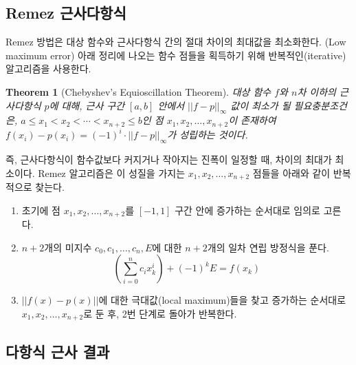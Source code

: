 \documentclass[a4paper, 11pt, chapterprefix=false]{report}
\newtheorem{theorem}{Theorem}
\begin{document}
\subsection{Remez 근사다항식}

Remez 방법은 대상 함수와 근사다항식 간의 절대 차이의 최대값을 최소화한다. (Low
maximum error) 아래 정리에 나오는 함수 점들을 획득하기 위해 반복적인(iterative)
알고리즘을 사용한다.

\begin{theorem}[Chebyshev's Equioscillation Theorem]
대상 함수 $f$와 $n$차 이하의 근사다항식 $p$에 대해, 근사 구간 $[a, b]$ 안에서
$||f-p||_\infty$ 값이 최소가 될 필요충분조건은, $a \leq x_1 < x_2 < \cdots <
x_{n+2} \leq b$인 점 $x_1, x_2, \dots, x_{n+2}$이 존재하여 $f(x_i) - p(x_i) =
(-1)^i \cdot ||f-p||_\infty$가 성립하는 것이다.
\end{theorem}

즉, 근사다항식이 함수값보다 커지거나 작아지는 진폭이 일정할 때, 차이의 최대가
최소이다. Remez 알고리즘은 이 성질을 가지는 $x_1, x_2, \dots, x_{n+2}$ 점들을
아래와 같이 반복적으로 찾는다.
\begin{enumerate}
  \item 초기에 점 $x_1, x_2, \dots, x_{n+2}$를 $[-1, 1]$ 구간 안에 증가하는 순서대로 임의로 고른다.
  \item $n+2$개의 미지수 $c_0, c_1, \dots, c_n, E$에 대한 $n+2$개의 일차 연립 방정식을 푼다.
        $$ \left( \sum_{i=0}^n c_i x_k^i \right) + (-1)^k E = f(x_k) $$
  \item $||f(x) - p(x)||$에 대한 극대값(local maximum)들을 찾고 증가하는 순서대로 $x_1, x_2, \dots, x_{n+2}$로 둔 후, 2번 단계로 돌아가 반복한다.
\end{enumerate}

\subsection{다항식 근사 결과}
\end{document}
